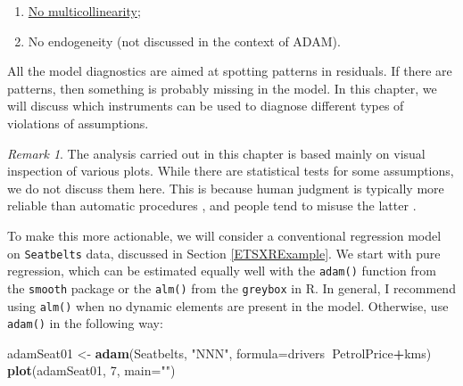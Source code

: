 \documentclass[]{book}
\newenvironment{Shaded}{\begin{snugshade}}{\end{snugshade}}
\newcommand{\DataTypeTok}[1]{\textcolor[rgb]{0.13,0.29,0.53}{#1}}
\newcommand{\DecValTok}[1]{\textcolor[rgb]{0.00,0.00,0.81}{#1}}
\newcommand{\KeywordTok}[1]{\textcolor[rgb]{0.13,0.29,0.53}{\textbf{#1}}}
\newcommand{\NormalTok}[1]{#1}
\newcommand{\OperatorTok}[1]{\textcolor[rgb]{0.81,0.36,0.00}{\textbf{#1}}}
\newcommand{\StringTok}[1]{\textcolor[rgb]{0.31,0.60,0.02}{#1}}
\providecommand{\tightlist}{%
  \setlength{\itemsep}{0pt}\setlength{\parskip}{0pt}}
\theoremstyle{definition}
\theoremstyle{definition}
\theoremstyle{definition}
\theoremstyle{definition}
\theoremstyle{remark}
\newtheorem*{remark}{Remark}
\begin{document}
\begin{enumerate}
\def\labelenumi{\alph{enumi}.}
\tightlist
\item
  \protect\hyperlink{diagnosticsMulticollinearity}{No multicollinearity};
\item
  No endogeneity (not discussed in the context of ADAM).
\end{enumerate}

All the model diagnostics are aimed at spotting patterns in residuals. If there are patterns, then something is probably missing in the model. In this chapter, we will discuss which instruments can be used to diagnose different types of violations of assumptions.

\begin{remark}
The analysis carried out in this chapter is based mainly on visual inspection of various plots. While there are statistical tests for some assumptions, we do not discuss them here. This is because human judgment is typically more reliable than automatic procedures \citep{Petropoulos2018a}, and people tend to misuse the latter \citep{Wasserstein2016}.
\end{remark}

To make this more actionable, we will consider a conventional regression model on \texttt{Seatbelts} data, discussed in Section \ref{ETSXRExample}. We start with pure regression, which can be estimated equally well with the \texttt{adam()} function from the \texttt{smooth} package or the \texttt{alm()} from the \texttt{greybox} in R. In general, I recommend using \texttt{alm()} when no dynamic elements are present in the model. Otherwise, use \texttt{adam()} in the following way:

\begin{Shaded}
\begin{Highlighting}[]
\NormalTok{adamSeat01 <-}\StringTok{ }\KeywordTok{adam}\NormalTok{(Seatbelts, }\StringTok{"NNN"}\NormalTok{,}
                   \DataTypeTok{formula=}\NormalTok{drivers}\OperatorTok{~}\NormalTok{PetrolPrice}\OperatorTok{+}\NormalTok{kms)}
\KeywordTok{plot}\NormalTok{(adamSeat01, }\DecValTok{7}\NormalTok{, }\DataTypeTok{main=}\StringTok{""}\NormalTok{)}
\end{Highlighting}
\end{Shaded}
\end{document}
